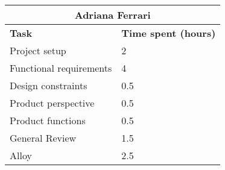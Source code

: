 \begin{table}[h]
  \center
  \begin{tabular}{l|l}
    \multicolumn{2}{c}{\textbf{Adriana Ferrari}} \\
    \hline
    \textbf{Task} & \textbf{Time spent (hours)}\\
    \hline
    Project setup & 2 \\
    Functional requirements & 4 \\
    Design constraints & 0.5 \\
    Product perspective & 0.5 \\
    Product functions & 0.5 \\
    General Review & 1.5 \\
    Alloy & 2.5 \\
  \end{tabular}
\end{table}